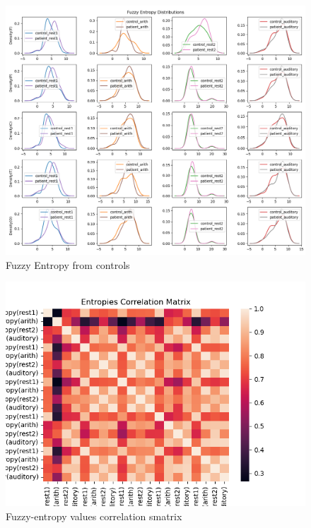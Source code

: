 \documentclass[10pt]{article}
\begin{document}
\begin{figure}[H]
  \includegraphics[width=16cm]{../../../data_analysis_results/FuzzEnt/corticalRegions_DAQphase_distributions.png}
  \caption{Fuzzy Entropy from controls}\label{fuzz_ent_distributions}
\end{figure}

\begin{figure}[H]
  \includegraphics[width=16cm]{../../../data_analysis_results/FuzzEnt/entropies_corr_mat.png}
  \caption{Fuzzy-entropy values correlation smatrix}\label{fuzz_ent_corr_mat}
\end{figure}
\end{document}
